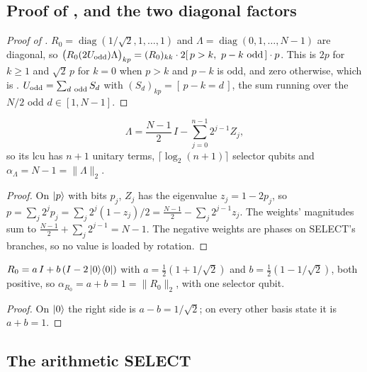 \subsection{Proof of \texorpdfstring{}{the factorisation}, and the two diagonal factors}
\label{app:proof-G-factorisation}

\begin{proof}[Proof of ]
$R_0=\operatorname{diag}(1/\sqrt2,1,\dots,1)$ and $\Lambda=\operatorname{diag}(0,1,\dots,N-1)$ are diagonal, so $\bigl(R_0(2\Uodd)\Lambda\bigr)_{kp}=(R_0)_{kk}\cdot2[\,p>k,\ p-k\ \text{odd}\,]\cdot p$. This is $2p$ for $k\ge1$ and $\sqrt2\,p$ for $k=0$ when $p>k$ and $p-k$ is odd, and zero otherwise, which is . $U_{\mathrm{odd}}=\sum_{d\ \text{odd}}S_d$ with $(S_d)_{kp}=[\,p-k=d\,]$, the sum running over the $N/2$ odd $d\in[1,N-1]$.
\end{proof}

\begin{lemma}
\begin{equation}
    \Lambda = \frac{N-1}{2}\,I - \sum_{j=0}^{n-1} 2^{j-1} Z_j ,
    \label{eq:lambda-lcu}
\end{equation}
so its \gls{lcu} has $n+1$ unitary terms, $\lceil\log_2(n+1)\rceil$ selector qubits and $\alpha_\Lambda=N-1=\|\Lambda\|_2$.
\end{lemma}
\begin{proof}
On $\ket{p}$ with bits $p_j$, $Z_j$ has the eigenvalue $z_j=1-2p_j$, so $p=\sum_j2^jp_j=\sum_j2^j(1-z_j)/2=\tfrac{N-1}{2}-\sum_j2^{j-1}z_j$. The weights' magnitudes sum to $\tfrac{N-1}{2}+\sum_j2^{j-1}=N-1$. The negative weights are phases on SELECT's branches, so no value is loaded by rotation.
\end{proof}

\begin{lemma}
$R_0=a\,I+b\,(I-2\ket{0}\!\bra{0})$ with $a=\tfrac12(1+1/\sqrt2)$ and $b=\tfrac12(1-1/\sqrt2)$, both positive, so $\alpha_{R_0}=a+b=1=\|R_0\|_2$, with one selector qubit.
\end{lemma}
\begin{proof}
On $\ket0$ the right side is $a-b=1/\sqrt2$; on every other basis state it is $a+b=1$.
\end{proof}

\subsection{The arithmetic SELECT}
\label{app:uodd-select-detail}

